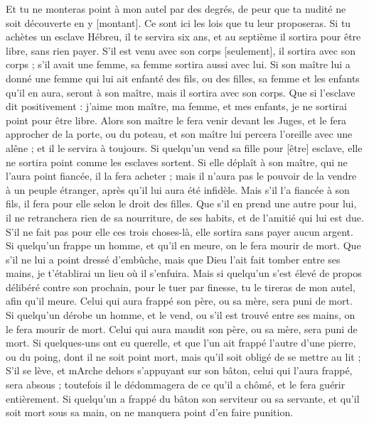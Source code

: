 \begin{multicols}{2}
Et tu ne monteras point à mon autel par des degrés, de peur que ta nudité ne soit découverte en y [montant].
\VerseOne{}Ce sont ici les lois que tu leur proposeras.
Si tu achètes un esclave Hébreu, il te servira six ans, et au septième il sortira pour être libre, sans rien payer.
S'il est venu avec son corps [seulement], il sortira avec son corps ; s'il avait une femme, sa femme sortira aussi avec lui.
Si son maître lui a donné une femme qui lui ait enfanté des fils, ou des filles, sa femme et les enfants qu'il en aura, seront à son maître, mais il sortira avec son corps.
Que si l'esclave dit positivement : j'aime mon maître, ma femme, et mes enfants, je ne sortirai point pour être libre.
Alors son maître le fera venir devant les Juges, et le fera approcher de la porte, ou du poteau, et son maître lui percera l'oreille avec une alêne ; et il le servira à toujours.
Si quelqu'un vend sa fille pour [être] esclave, elle ne sortira point comme les esclaves sortent.
Si elle déplaît à son maître, qui ne l'aura point fiancée, il la fera acheter ; mais il n'aura pas le pouvoir de la vendre à un peuple étranger, après qu'il lui aura été infidèle.
Mais s'il l'a fiancée à son fils, il fera pour elle selon le droit des filles.
Que s'il en prend une autre pour lui, il ne retranchera rien de sa nourriture, de ses habits, et de l'amitié qui lui est due.
S'il ne fait pas pour elle ces trois choses-là, elle sortira sans payer aucun argent.
Si quelqu'un frappe un homme, et qu'il en meure, on le fera mourir de mort.
Que s'il ne lui a point dressé d'embûche, mais que Dieu l'ait fait tomber entre ses mains, je t'établirai un lieu où il s'enfuira.
Mais si quelqu'un s'est élevé de propos délibéré contre son prochain, pour le tuer par finesse, tu le tireras de mon autel, afin qu'il meure.
Celui qui aura frappé son père, ou sa mère, sera puni de mort.
Si quelqu'un dérobe un homme, et le vend, ou s'il est trouvé entre ses mains, on le fera mourir de mort.
Celui qui aura maudit son père, ou sa mère, sera puni de mort.
Si quelques-uns ont eu querelle, et que l'un ait frappé l'autre d'une pierre, ou du poing, dont il ne soit point mort, mais qu'il soit obligé de se mettre au lit ;
S'il se lève, et mArche dehors s'appuyant sur son bâton, celui qui l'aura frappé, sera absous ; toutefois il le dédommagera de ce qu'il a chômé, et le fera guérir entièrement.
Si quelqu'un a frappé du bâton son serviteur ou sa servante, et qu'il soit mort sous sa main, on ne manquera point d'en faire punition.

\end{multicols}
